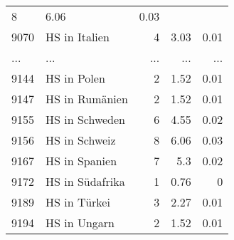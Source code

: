 \begin{longtable}{lXrrr}
          \num{8} &
          \num[round-mode=places,round-precision=2]{6.06} &
          \num[round-mode=places,round-precision=2]{0.03} \\
        9070 & \multicolumn{1}{X}{HS in Italien} & %
          \num{4} &
          \num[round-mode=places,round-precision=2]{3.03} &
          \num[round-mode=places,round-precision=2]{0.01} \\
       ... & ... & ... & ... & ... \\
        9144 & \multicolumn{1}{X}{HS in Polen} & %
          \num{2} &
          \num[round-mode=places,round-precision=2]{1.52} &
          \num[round-mode=places,round-precision=2]{0.01} \\

        9147 & \multicolumn{1}{X}{HS in Rumänien} & %
          \num{2} &
          \num[round-mode=places,round-precision=2]{1.52} &
          \num[round-mode=places,round-precision=2]{0.01} \\

        9155 & \multicolumn{1}{X}{HS in Schweden} & %
          \num{6} &
          \num[round-mode=places,round-precision=2]{4.55} &
          \num[round-mode=places,round-precision=2]{0.02} \\

        9156 & \multicolumn{1}{X}{HS in Schweiz} & %
          \num{8} &
          \num[round-mode=places,round-precision=2]{6.06} &
          \num[round-mode=places,round-precision=2]{0.03} \\

        9167 & \multicolumn{1}{X}{HS in Spanien} & %
          \num{7} &
          \num[round-mode=places,round-precision=2]{5.3} &
          \num[round-mode=places,round-precision=2]{0.02} \\

        9172 & \multicolumn{1}{X}{HS in Südafrika} & %
          \num{1} &
          \num[round-mode=places,round-precision=2]{0.76} &
          \num[round-mode=places,round-precision=2]{0} \\

        9189 & \multicolumn{1}{X}{HS in Türkei} & %
          \num{3} &
          \num[round-mode=places,round-precision=2]{2.27} &
          \num[round-mode=places,round-precision=2]{0.01} \\

        9194 & \multicolumn{1}{X}{HS in Ungarn} & %
          \num{2} &
          \num[round-mode=places,round-precision=2]{1.52} &
          \num[round-mode=places,round-precision=2]{0.01} \\


\end{longtable}
